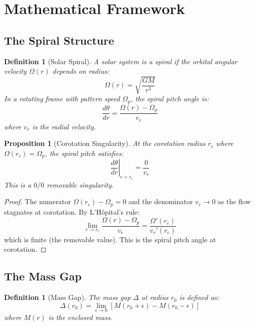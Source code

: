 \documentclass[12pt]{article}
\newtheorem{proposition}[theorem]{Proposition}
\newtheorem{definition}[theorem]{Definition}
\begin{document}
\section{Mathematical Framework}

\subsection{The Spiral Structure}

\begin{definition}[Solar Spiral]
A solar system is a spiral if the orbital angular velocity $\Omega(r)$ depends on radius:
\begin{equation}
\Omega(r) = \sqrt{\frac{GM}{r^3}}
\end{equation}
In a rotating frame with pattern speed $\Omega_p$, the spiral pitch angle is:
\begin{equation}
\frac{d\theta}{dr} = \frac{\Omega(r) - \Omega_p}{v_r}
\end{equation}
where $v_r$ is the radial velocity.
\end{definition}

\begin{proposition}[Corotation Singularity]
At the corotation radius $r_c$ where $\Omega(r_c) = \Omega_p$, the spiral pitch satisfies:
\begin{equation}
\left.\frac{d\theta}{dr}\right|_{r=r_c} = \frac{0}{v_r}
\end{equation}
This is a $0/0$ removable singularity.
\end{proposition}

\begin{proof}
The numerator $\Omega(r_c) - \Omega_p = 0$ and the denominator $v_r \to 0$ as the flow stagnates at corotation. By L'H\^{o}pital's rule:
\begin{equation}
\lim_{r \to r_c} \frac{\Omega(r) - \Omega_p}{v_r} = \frac{\Omega'(r_c)}{v_r'(r_c)}
\end{equation}
which is finite (the removable value). This is the spiral pitch angle at corotation.
\end{proof}

\subsection{The Mass Gap}

\begin{definition}[Mass Gap]
The mass gap $\Delta$ at radius $r_0$ is defined as:
\begin{equation}
\Delta(r_0) = \lim_{\epsilon \to 0} \left[ M(r_0 + \epsilon) - M(r_0 - \epsilon) \right]
\end{equation}
where $M(r)$ is the enclosed mass.
\end{definition}
\end{document}
